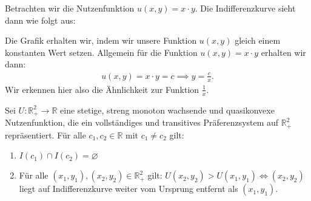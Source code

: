 \begin{example}
	Betrachten wir die Nutzenfunktion $u(x,y) = x\cdot y$. Die Indifferenzkurve sieht dann wie folgt aus:
	\begin{center}
	\end{center}
	Die Grafik erhalten wir, indem wir unsere Funktion $u(x,y)$ gleich einem konstanten Wert setzen.
	Allgemein für die Funktion $u(x,y) = x\cdot y$ erhalten wir dann:
	\begin{align*}
		u(x,y) = x \cdot y = c \implies y = \frac{c}{x}
		.\end{align*}
	Wir erkennen hier also die Ähnlichkeit zur Funktion $\frac{1}{x}$.
\end{example}

\begin{lemma} \label{lem:indifferenzkurve}
	Sei $U: \mathbb{R}_{+}^2 \rightarrow \mathbb{R}$ eine stetige, streng monoton wachsende und quasikonvexe Nutzenfunktion, die ein vollständiges und transitives Präferenzsystem auf $\mathbb{R}_{+}^2$ repräsentiert.
	Für alle $c_1, c_2 \in \mathbb{R}$ mit $c_1 \neq c_2$ gilt:
	\begin{enumerate}
		\item $I(c_1) \cap I(c_2) = \varnothing$
		\item Für alle $(x_1, y_1), (x_2, y_2) \in \mathbb{R}_{+}^2$ gilt: $U(x_2, y_2) > U(x_1, y_1) \iff (x_2, y_2)$ liegt auf Indifferenzkurve weiter vom Ursprung entfernt als $(x_1, y_1)$.

	\end{enumerate}
\end{lemma}

